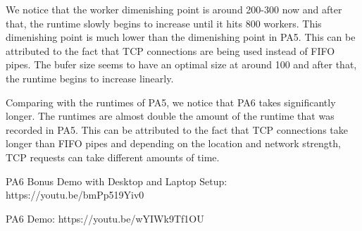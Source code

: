 \documentclass[12pt]{article}
\begin{document}
We notice that the worker dimenishing point is around 200-300 now and after that, the runtime slowly begins to increase until it hits 800 workers. This dimenishing point is much lower than the dimenishing point in PA5. This can be attributed to the fact that TCP connections are being used instead of FIFO pipes. The bufer size seems to have an optimal size at around 100 and after that, the runtime begins to increase linearly. 

Comparing with the runtimes of PA5, we notice that PA6 takes significantly longer. The runtimes are almost double the amount of the runtime that was recorded in PA5. This can be attributed to the fact that TCP connections take longer than FIFO pipes and depending on the location and network strength, TCP requests can take different amounts of time. 

PA6 Bonus Demo with Desktop and Laptop Setup: https://youtu.be/bmPp519Yiv0

PA6 Demo: https://youtu.be/wYIWk9Tf1OU
\end{document}
